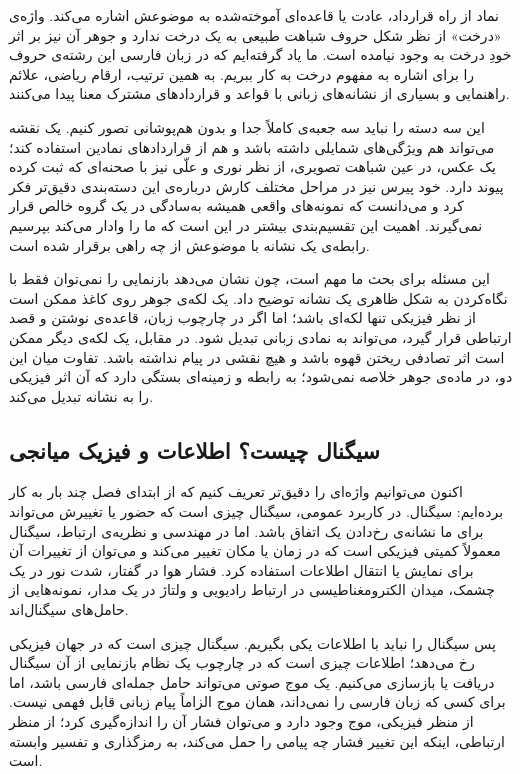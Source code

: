 نماد از راه قرارداد، عادت یا قاعده‌ای آموخته‌شده به موضوعش اشاره می‌کند. واژه‌ی «درخت» از نظر شکل حروف شباهت طبیعی به یک درخت ندارد و جوهر آن نیز بر اثر خودِ درخت به وجود نیامده است. ما یاد گرفته‌ایم که در زبان فارسی این رشته‌ی حروف را برای اشاره به مفهوم درخت به کار ببریم. به همین ترتیب، ارقام ریاضی، علائم راهنمایی و بسیاری از نشانه‌های زبانی با قواعد و قراردادهای مشترک معنا پیدا می‌کنند.

این سه دسته را نباید سه جعبه‌ی کاملاً جدا و بدون هم‌پوشانی تصور کنیم. یک نقشه می‌تواند هم ویژگی‌های شمایلی داشته باشد و هم از قراردادهای نمادین استفاده کند؛ یک عکس، در عین شباهت تصویری، از نظر نوری و علّی نیز با صحنه‌ای که ثبت کرده پیوند دارد. خود پیرس نیز در مراحل مختلف کارش درباره‌ی این دسته‌بندی دقیق‌تر فکر کرد و می‌دانست که نمونه‌های واقعی همیشه به‌سادگی در یک گروه خالص قرار نمی‌گیرند. اهمیت این تقسیم‌بندی بیشتر در این است که ما را وادار می‌کند بپرسیم رابطه‌ی یک نشانه با موضوعش از چه راهی برقرار شده است. \autocite{sep-peirce-semiotics}

این مسئله برای بحث ما مهم است، چون نشان می‌دهد بازنمایی را نمی‌توان فقط با نگاه‌کردن به شکل ظاهری یک نشانه توضیح داد. یک لکه‌ی جوهر روی کاغذ ممکن است از نظر فیزیکی تنها لکه‌ای باشد؛ اما اگر در چارچوب زبان، قاعده‌ی نوشتن و قصد ارتباطی قرار گیرد، می‌تواند به نمادی زبانی تبدیل شود. در مقابل، یک لکه‌ی دیگر ممکن است اثر تصادفی ریختن قهوه باشد و هیچ نقشی در پیام نداشته باشد. تفاوت میان این دو، در ماده‌ی جوهر خلاصه نمی‌شود؛ به رابطه و زمینه‌ای بستگی دارد که آن اثر فیزیکی را به نشانه تبدیل می‌کند.

\subsection{سیگنال چیست؟ اطلاعات و فیزیک میانجی}
\label{sub:what-is-signal}

اکنون می‌توانیم واژه‌ای را دقیق‌تر تعریف کنیم که از ابتدای فصل چند بار به کار برده‌ایم: سیگنال. در کاربرد عمومی، سیگنال چیزی است که حضور یا تغییرش می‌تواند برای ما نشانه‌ی رخ‌دادن یک اتفاق باشد. اما در مهندسی و نظریه‌ی ارتباط، سیگنال معمولاً کمیتی فیزیکی است که در زمان یا مکان تغییر می‌کند و می‌توان از تغییرات آن برای نمایش یا انتقال اطلاعات استفاده کرد. فشار هوا در گفتار، شدت نور در یک چشمک، میدان الکترومغناطیسی در ارتباط رادیویی و ولتاژ در یک مدار، نمونه‌هایی از حامل‌های سیگنال‌اند.

پس سیگنال را نباید با اطلاعات یکی بگیریم. سیگنال چیزی است که در جهان فیزیکی رخ می‌دهد؛ اطلاعات چیزی است که در چارچوب یک نظام بازنمایی از آن سیگنال دریافت یا بازسازی می‌کنیم. یک موج صوتی می‌تواند حامل جمله‌ای فارسی باشد، اما برای کسی که زبان فارسی را نمی‌داند، همان موج الزاماً پیام زبانی قابل فهمی نیست. از منظر فیزیکی، موج وجود دارد و می‌توان فشار آن را اندازه‌گیری کرد؛ از منظر ارتباطی، اینکه این تغییر فشار چه پیامی را حمل می‌کند، به رمزگذاری و تفسیر وابسته است.


